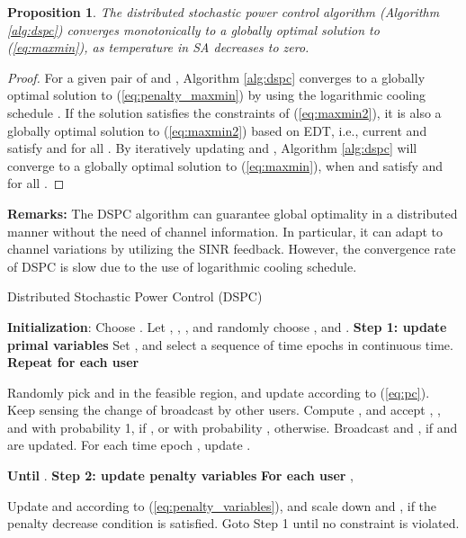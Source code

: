 \documentclass[10pt,journal,letterpaper,compsoc]{IEEEtran}
\newtheorem{prop}{\textbf{Proposition}}[section]
\begin{document}
{{\begin{prop}
The distributed stochastic power control algorithm (Algorithm \ref{alg:dspc}) converges monotonically to a globally optimal solution to (\ref{eq:maxmin}), as temperature  in SA decreases to zero.
\label{prop:dspc}
\end{prop}
\begin{proof}
For a given pair of  and , Algorithm \ref{alg:dspc} converges to a globally optimal solution to (\ref{eq:penalty_maxmin}) by using the logarithmic cooling schedule \cite{geman:1984,hajek:1988}. If the solution satisfies the constraints of (\ref{eq:maxmin2}), it is also a globally optimal solution to (\ref{eq:maxmin2}) based on EDT, i.e., current  and  satisfy  and  for all  \cite{chen:2008}. By iteratively updating  and , Algorithm \ref{alg:dspc} will converge to a globally optimal solution to (\ref{eq:maxmin}), when  and  satisfy  and  for all .
\end{proof}

{\bf Remarks:} The DSPC algorithm can guarantee global optimality in a distributed manner without the need of channel information. In particular, it can adapt to channel variations by utilizing the SINR feedback. However, the convergence rate of DSPC is slow due to the use of logarithmic cooling schedule.



\begin{algorithm}
\caption{Distributed Stochastic Power Control (DSPC)}
\label{alg:dspc}
\begin{algorithmic}
\STATE \textbf{Initialization}: Choose . Let , , , and randomly choose ,  and .
\STATE \textbf{Step 1: update primal variables}
\STATE Set , and select a sequence of time epochs  in continuous time.
\STATE \quad \textbf{Repeat for each user} 
\begin{enumerate}
\STATE Randomly pick  and  in the feasible region, and update  according to (\ref{eq:pc}).
\STATE Keep sensing the change of  broadcast by other users.
\STATE Compute , and accept , , and  with probability 1, if , or with probability , otherwise.
\STATE Broadcast  and , if  and  are updated.
\STATE For each time epoch , update .
\end{enumerate}
\STATE \quad \textbf{Until} .
\STATE \textbf{Step 2: update penalty variables}
\STATE \quad \textbf{For each user} ,
\begin{enumerate}
\STATE Update  and  according to (\ref{eq:penalty_variables}), and scale down  and , if the penalty decrease condition is satisfied.
\STATE Goto Step 1 until no constraint is violated.
\end{enumerate}
\end{algorithmic}
\end{algorithm}

}}
\end{document}
